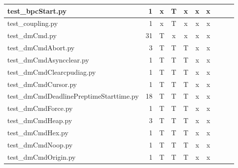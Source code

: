 \documentclass[12pt,a4paper]{report}
\begin{document}
\begin{table}
\begin{tabular}[t]{|l|r|c|c|c|c|c|c|c|c|}
test\_bpcStart.py                       &  1                  &   x        &   T             &   x           &   x              &   x                 \\ \hline
test\_coupling.py                       &  1                  &   x        &   T             &   x           &   x              &   x                 \\ \hline
test\_dmCmd.py                          &  31                 &   T        &   x             &   x           &   x              &   x                 \\ \hline
test\_dmCmdAbort.py                     &  3                  &   T        &   T             &   T           &   x              &   x                 \\ \hline
test\_dmCmdAsyncclear.py                &  1                  &   T        &   T             &   T           &   x              &   x                 \\ \hline
test\_dmCmdClearcpudiag.py              &  1                  &   T        &   T             &   T           &   x              &   x                 \\ \hline
test\_dmCmdCursor.py                    &  1                  &   T        &   T             &   T           &   x              &   x                 \\ \hline
test\_dmCmdDeadlinePreptimeStarttime.py &  18                 &   T        &   T             &   T           &   x              &   x                 \\ \hline
test\_dmCmdForce.py                     &  1                  &   T        &   T             &   T           &   x              &   x                 \\ \hline
test\_dmCmdHeap.py                      &  3                  &   T        &   T             &   T           &   x              &   x                 \\ \hline
test\_dmCmdHex.py                       &  1                  &   T        &   T             &   T           &   x              &   x                 \\ \hline
test\_dmCmdNoop.py                      &  1                  &   T        &   T             &   T           &   x              &   x                 \\ \hline
test\_dmCmdOrigin.py                    &  1                  &   T        &   T             &   T           &   x              &   x                 \\ \hline

\end{tabular}
\end{table}
\end{document}
